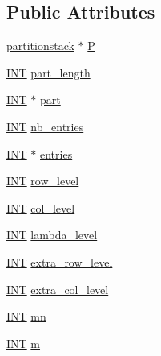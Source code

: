 \subsection*{Public Attributes}
\begin{DoxyCompactItemize}
\item 
\mbox{\hyperlink{classpartitionstack}{partitionstack}} $\ast$ \mbox{\hyperlink{classtdo__scheme_ac9beab3ff56b5145a9b141f3b1bf75d0}{P}}
\item 
\mbox{\hyperlink{galois_8h_a09fddde158a3a20bd2dcadb609de11dc}{I\+NT}} \mbox{\hyperlink{classtdo__scheme_a38ee3bf23440a8869dc68d92097dca85}{part\+\_\+length}}
\item 
\mbox{\hyperlink{galois_8h_a09fddde158a3a20bd2dcadb609de11dc}{I\+NT}} $\ast$ \mbox{\hyperlink{classtdo__scheme_a670c75bc7276a4dac4c12656e3906924}{part}}
\item 
\mbox{\hyperlink{galois_8h_a09fddde158a3a20bd2dcadb609de11dc}{I\+NT}} \mbox{\hyperlink{classtdo__scheme_a4b1aec8f3493f4abb10e7c03eeb48d60}{nb\+\_\+entries}}
\item 
\mbox{\hyperlink{galois_8h_a09fddde158a3a20bd2dcadb609de11dc}{I\+NT}} $\ast$ \mbox{\hyperlink{classtdo__scheme_ae4ca55108570de285018959258103fb3}{entries}}
\item 
\mbox{\hyperlink{galois_8h_a09fddde158a3a20bd2dcadb609de11dc}{I\+NT}} \mbox{\hyperlink{classtdo__scheme_a39330f3c7c1c275e32d7d313630ed6d2}{row\+\_\+level}}
\item 
\mbox{\hyperlink{galois_8h_a09fddde158a3a20bd2dcadb609de11dc}{I\+NT}} \mbox{\hyperlink{classtdo__scheme_a267a1d027bb365ae95141a8d7b6bbc35}{col\+\_\+level}}
\item 
\mbox{\hyperlink{galois_8h_a09fddde158a3a20bd2dcadb609de11dc}{I\+NT}} \mbox{\hyperlink{classtdo__scheme_aa4029ca357371d64c3715f9d40c0b752}{lambda\+\_\+level}}
\item 
\mbox{\hyperlink{galois_8h_a09fddde158a3a20bd2dcadb609de11dc}{I\+NT}} \mbox{\hyperlink{classtdo__scheme_a416dfb24e31be5c2686f141c8c591531}{extra\+\_\+row\+\_\+level}}
\item 
\mbox{\hyperlink{galois_8h_a09fddde158a3a20bd2dcadb609de11dc}{I\+NT}} \mbox{\hyperlink{classtdo__scheme_a232d0e70309ec0a07a706529ef9d3dda}{extra\+\_\+col\+\_\+level}}
\item 
\mbox{\hyperlink{galois_8h_a09fddde158a3a20bd2dcadb609de11dc}{I\+NT}} \mbox{\hyperlink{classtdo__scheme_a6588af8463d3b4853438426c1c1bbb69}{mn}}
\item 
\mbox{\hyperlink{galois_8h_a09fddde158a3a20bd2dcadb609de11dc}{I\+NT}} \mbox{\hyperlink{classtdo__scheme_a9af99d7f94c680a8067906ba9992eca5}{m}}

\end{DoxyCompactItemize}
